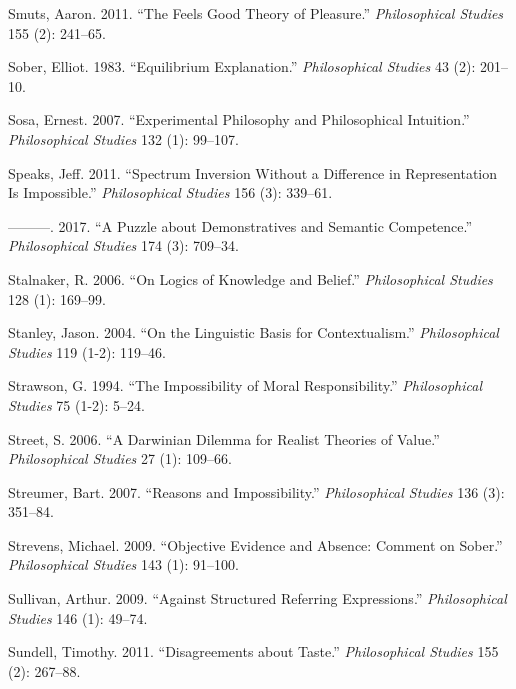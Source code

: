 \documentclass[
  10pt,
  letterpaper,
  DIV=11,
  numbers=noendperiod,
  twoside]{scrartcl}
\newlength{\cslhangindent}
\newenvironment{CSLReferences}[2] %
 {\begin{list}{}{%
  \setlength{\itemindent}{0pt}
  \setlength{\leftmargin}{0pt}
  \setlength{\parsep}{0pt}
  \ifodd #1
   \setlength{\leftmargin}{\cslhangindent}
   \setlength{\itemindent}{-1\cslhangindent}
  \fi
  \setlength{\itemsep}{#2\baselineskip}}}
 {\end{list}}
\begin{document}
\begin{CSLReferences}{1}{0}
Smuts, Aaron. 2011. {``The Feels Good Theory of Pleasure.''}
\emph{Philosophical Studies} 155 (2): 241--65.

Sober, Elliot. 1983. {``Equilibrium Explanation.''} \emph{Philosophical
Studies} 43 (2): 201--10.

Sosa, Ernest. 2007. {``Experimental Philosophy and Philosophical
Intuition.''} \emph{Philosophical Studies} 132 (1): 99--107.

Speaks, Jeff. 2011. {``Spectrum Inversion Without a Difference in
Representation Is Impossible.''} \emph{Philosophical Studies} 156 (3):
339--61.

---------. 2017. {``A Puzzle about Demonstratives and Semantic
Competence.''} \emph{Philosophical Studies} 174 (3): 709--34.

Stalnaker, R. 2006. {``On Logics of Knowledge and Belief.''}
\emph{Philosophical Studies} 128 (1): 169--99.

Stanley, Jason. 2004. {``On the Linguistic Basis for Contextualism.''}
\emph{Philosophical Studies} 119 (1-2): 119--46.

Strawson, G. 1994. {``The Impossibility of Moral Responsibility.''}
\emph{Philosophical Studies} 75 (1-2): 5--24.

Street, S. 2006. {``A Darwinian Dilemma for Realist Theories of
Value.''} \emph{Philosophical Studies} 27 (1): 109--66.

Streumer, Bart. 2007. {``Reasons and Impossibility.''}
\emph{Philosophical Studies} 136 (3): 351--84.

Strevens, Michael. 2009. {``Objective Evidence and Absence: Comment on
Sober.''} \emph{Philosophical Studies} 143 (1): 91--100.

Sullivan, Arthur. 2009. {``Against Structured Referring Expressions.''}
\emph{Philosophical Studies} 146 (1): 49--74.

Sundell, Timothy. 2011. {``Disagreements about Taste.''}
\emph{Philosophical Studies} 155 (2): 267--88.


\end{CSLReferences}
\end{document}
